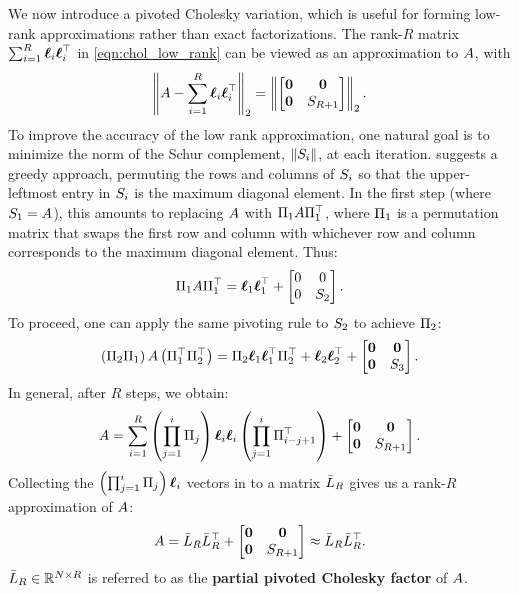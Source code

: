 We now introduce a pivoted Cholesky variation, which is useful for forming low-rank approximations rather than exact factorizations.
The rank-$R$ matrix $\sum_{i=1}^{R}{\boldsymbol{\ell}}_{i}{\boldsymbol{\ell}}_{i}^{\top}$ in \cref{eqn:chol_low_rank} can be viewed as an approximation to $A$, with
$$
  \left\Vert A - \sum_{i=1}^{R}{\boldsymbol{\ell}}_{i}{\boldsymbol{\ell}}_{i}^{\top} \right\Vert_{2} = \left\Vert \begin{bmatrix} \mathbf{0} & \mathbf{0} \\ \mathbf{0} & S_{R+1} \end{bmatrix} \right\Vert_2.
$$
%
To improve the accuracy of the low rank approximation, one natural goal is to minimize the norm of the Schur complement, $\Vert S_{i} \Vert$, at each iteration.
\citet{harbrecht2012low} suggests a greedy approach, permuting the rows and columns of $S_{i}$ so that the upper-leftmost entry in $S_{i}$ is the maximum diagonal element.
In the first step (where $S_1 = A$), this amounts to replacing $A$ with $\Pi_{1} A \Pi_{1}^\top$, where $\Pi_{1}$ is a permutation matrix that swaps the first row and column with whichever row and column corresponds to the maximum diagonal element.
Thus:
%
\begin{align*}
  \Pi_{1} A \Pi_{1}^\top = \boldsymbol{\ell}_{1}\boldsymbol{\ell}_{1}^{\top} + \begin{bmatrix} 0 & 0 \\ 0 & S_2 \end{bmatrix}.
\end{align*}
%
To proceed, one can apply the same pivoting rule to $S_2$ to achieve $\Pi_{2}$:
%
\begin{align*}
  \left( \Pi_{2} \Pi_{1} \right) A \left( \Pi_{1}^\top \Pi_{2}^\top \right) = \Pi_{2} \boldsymbol{\ell}_{1}\boldsymbol{\ell}_{1}^{\top} \Pi_2^\top
  + \boldsymbol{\ell}_2 \boldsymbol{\ell}_2^\top + \begin{bmatrix} \mathbf{0} & \mathbf{0} \\ \mathbf{0} & S_3 \end{bmatrix}.
\end{align*}
%
In general, after $R$ steps, we obtain:
\begin{align}
  A = \sum_{i=1}^{R} \left( \prod_{j=1}^i \Pi_j \right) {\boldsymbol{\ell}}_{i} {\boldsymbol{\ell}}_{i} \left( \prod_{j=1}^i \Pi_{i-j+1}^\top \right)
  + \begin{bmatrix} \mathbf{0} & \mathbf{0} \\ \mathbf{0} & S_{R+1} \end{bmatrix}.
\end{align}
Collecting the $\left( \prod_{j=1}^i \Pi_j \right) {\boldsymbol{\ell}}_{i}$ vectors in to a matrix $\bar{L}_R$ gives us a rank-$R$ approximation of $A$:
%
\begin{equation}
  A = \bar{L}_{R} \bar{L}_{R}^{\top} + \begin{bmatrix} \mathbf{0} & \mathbf{0} \\ \mathbf{0} & S_{R+1} \end{bmatrix} \approx \bar{L}_{R} \bar{L}_{R}^{\top}.
\end{equation}
%
$\bar{L}_{R} \in \mathbb{R}^{N \times R}$ is referred to as the {\bf partial pivoted Cholesky factor} of $A$.


